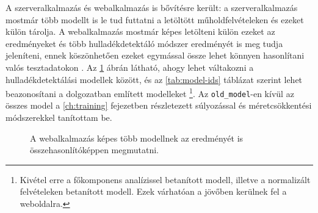 A szerveralkalmazás és webalkalmazás is bővítésre került: a szerveralkalmazás mostmár több modellt is le tud futtatni a letöltött műholdfelvételeken és ezeket külön tárolja. A webalkalmazás mostmár képes letölteni külön ezeket az eredményeket és több hulladékdetektáló módszer eredményét is meg tudja jeleníteni, ennek köszönhetően ezeket egymással össze lehet könnyen hasonlítani valós tesztadatokon \cite{wastedetection2024}. Az \ref{fig:waste-detection-demo} ábrán látható, ahogy lehet váltakozni a hulladékdetektálási modellek között, és az \ref{tab:model-ids} táblázat szerint lehet beazonosítani a dolgozatban említett modelleket \footnote{Kivétel erre a főkomponens analízissel betanított modell, illetve a normalizált felvételeken betanított modell. Ezek várhatóan a jövőben kerülnek fel a weboldalra.}. Az \texttt{old\_model}-en kívül az összes model a \ref{ch:training} fejezetben részletezett súlyozással és méretcsökkentési módszerekkel tanítottam be.

\begin{figure}[H]
	\centering
	\hspace{5pt}
	\caption{A webalkalmazás képes több modellnek az eredményét is összehasonlítóképpen megmutatni.}
	\label{fig:waste-detection-demo}
\end{figure}

